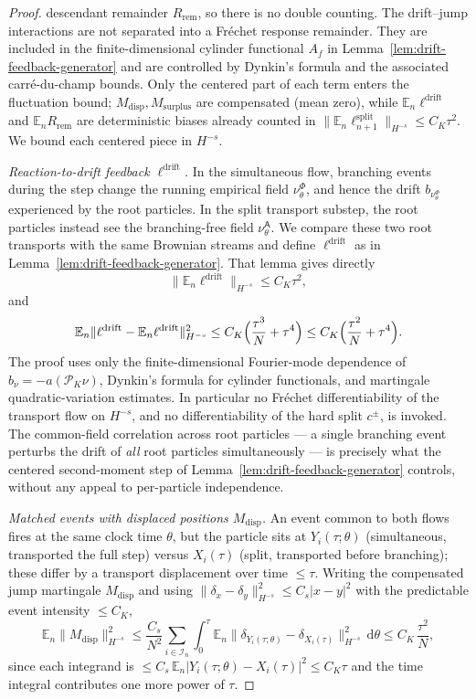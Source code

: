 \documentclass[a4paper,fleqn]{cas-sc}
\theoremstyle{definition}
\theoremstyle{remark}
\begin{document}
\begin{proof}
descendant remainder $R_{\mathrm{rem}}$, so there is no double counting. The drift--jump
interactions are not separated into a Fr\'echet response remainder. They are
included in the finite-dimensional cylinder functional $A_f$ in
Lemma~\ref{lem:drift-feedback-generator} and are controlled by Dynkin's formula
and the associated carr\'e-du-champ bounds. Only the centered part of each term enters the
fluctuation bound; $M_{\mathrm{disp}},M_{\mathrm{surplus}}$ are compensated (mean
zero), while $\mathbb E_n\ell^{\mathrm{drift}}$ and $\mathbb E_nR_{\mathrm{rem}}$ are
deterministic biases already counted in
$\|\mathbb E_n\ell^{\mathrm{split}}_{n+1}\|_{H^{-s}}\le C_K\tau^2$. We bound each
centered piece in $H^{-s}$.

\emph{Reaction-to-drift feedback $\ell^{\mathrm{drift}}$.}
In the simultaneous flow, branching events during the step change the running
empirical field $\nu^\Phi_\theta$, and hence the drift $b_{\nu^\Phi_\theta}$
experienced by the root particles. In the split transport substep, the root
particles instead see the branching-free field $\nu^{\mathsf A}_\theta$. We
compare these two root transports with the same Brownian streams and define
$\ell^{\mathrm{drift}}$ as in Lemma~\ref{lem:drift-feedback-generator}. That
lemma gives directly
\[
\|\mathbb E_n\ell^{\mathrm{drift}}\|_{H^{-s}}\le C_K\tau^2,
\]
and
\[
\mathbb E_n\|\ell^{\mathrm{drift}}-\mathbb E_n\ell^{\mathrm{drift}}\|_{H^{-s}}^2
\le C_K\Bigl(\frac{\tau^3}{N}+\tau^4\Bigr)
\le C_K\Bigl(\frac{\tau^2}{N}+\tau^4\Bigr).
\]
The proof uses only the finite-dimensional Fourier-mode dependence of
$b_\nu=-a(\mathcal P_K\nu)$, Dynkin's formula for cylinder functionals,
and martingale quadratic-variation estimates. In particular no Fr\'echet
differentiability of the transport flow on $H^{-s}$, and no differentiability of
the hard split $c^\pm$, is invoked. The common-field correlation across root
particles --- a single branching event perturbs the drift of \emph{all} root
particles simultaneously --- is precisely what the centered second-moment step of
Lemma~\ref{lem:drift-feedback-generator} controls, without any appeal to
per-particle independence.

\emph{Matched events with displaced positions $M_{\mathrm{disp}}$.} An event
common to both flows fires at the same clock time $\theta$, but the particle sits
at $Y_i(\tau;\theta)$ (simultaneous, transported the full step) versus $X_i(\tau)$
(split, transported before branching); these differ by a transport displacement
over time $\le\tau$. Writing the compensated jump martingale $M_{\mathrm{disp}}$
and using $\|\delta_x-\delta_y\|_{H^{-s}}^2\le C_s|x-y|^2$ with the predictable
event intensity $\le C_K$,
\[
\mathbb E_n\|M_{\mathrm{disp}}\|_{H^{-s}}^2
\le\frac{C_s}{N^2}\sum_{i\in\mathcal I_n}\int_0^\tau
\mathbb E_n\|\delta_{Y_i(\tau;\theta)}-\delta_{X_i(\tau)}\|_{H^{-s}}^2\,\mathrm d\theta
\le C_K\,\frac{\tau^2}{N},
\]
since each integrand is $\le C_s\,\mathbb E_n|Y_i(\tau;\theta)-X_i(\tau)|^2\le C_K\tau$
and the time integral contributes one more power of $\tau$.


\end{proof}
\end{document}
